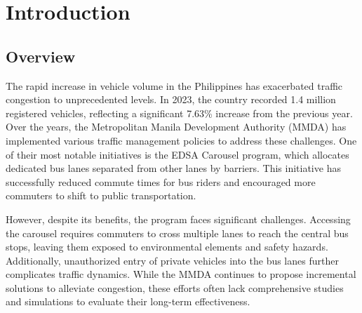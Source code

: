 
\section{Introduction}
\subsection{Overview}

The rapid increase in vehicle volume in the Philippines has exacerbated traffic congestion to unprecedented levels. In 2023, the country recorded 1.4 million registered vehicles, reflecting a significant 7.63\% increase from the previous year. Over the years, the Metropolitan Manila Development Authority (MMDA) has implemented various traffic management policies to address these challenges. One of their most notable initiatives is the EDSA Carousel program, which allocates dedicated bus lanes separated from other lanes by barriers. This initiative has successfully reduced commute times for bus riders and encouraged more commuters to shift to public transportation.

However, despite its benefits, the program faces significant challenges. Accessing the carousel requires commuters to cross multiple lanes to reach the central bus stops, leaving them exposed to environmental elements and safety hazards. Additionally, unauthorized entry of private vehicles into the bus lanes further complicates traffic dynamics. While the MMDA continues to propose incremental solutions to alleviate congestion, these efforts often lack comprehensive studies and simulations to evaluate their long-term effectiveness.

